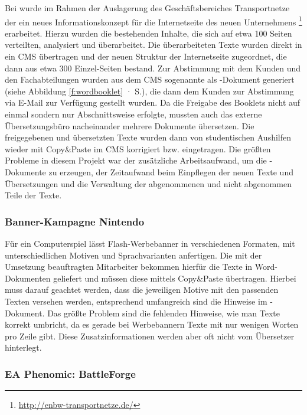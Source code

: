 Bei  wurde im Rahmen der Auslagerung des Geschäftsbereiches Transportnetze der  ein neues Informationskonzept für die Internetseite des neuen Unternehmens \footnote{\url{http://enbw-transportnetze.de/}} erarbeitet. Hierzu wurden die bestehenden Inhalte, die sich auf etwa 100 Seiten verteilten, analysiert und überarbeitet. Die überarbeiteten Texte wurden direkt in ein CMS übertragen und der neuen Struktur der Internetseite zugeordnet, die dann aus etwa 300 Einzel-Seiten bestand. Zur Abstimmung mit dem Kunden und den Fachabteilungen wurden aus dem CMS sogenannte  als -Dokument generiert (siehe Abbildung \ref{f:wordbooklet} · S.\pageref{f:wordbooklet}), die dann dem Kunden zur Abstimmung via E-Mail zur Verfügung gestellt wurden. Da die Freigabe des Booklets nicht auf einmal sondern nur Abschnittsweise erfolgte, mussten auch das externe Übersetzungsbüro nacheinander mehrere Dokumente übersetzen. Die freigegebenen und übersetzten Texte wurden dann von studentischen Aushilfen wieder mit Copy\&Paste im CMS korrigiert bzw. eingetragen. Die größten Probleme in diesem Projekt war der zusätzliche Arbeitsaufwand, um die -Dokumente zu erzeugen, der Zeitaufwand beim Einpflegen der neuen Texte und Übersetzungen und die Verwaltung der abgenommenen und nicht abgenommen Teile der Texte.

\subsubsection{Banner-Kampagne Nintendo}

Für ein Computerspiel lässt  Flash-Werbebanner in verschiedenen Formaten, mit unterschiedlichen Motiven und Sprachvarianten anfertigen. Die mit der Umsetzung beauftragten Mitarbeiter bekommen hierfür die Texte in Word-Dokumenten geliefert und müssen diese mittels Copy\&Paste übertragen. Hierbei muss darauf geachtet werden, dass die jeweiligen Motive mit den passenden Texten versehen werden, entsprechend umfangreich sind die Hinweise im -Dokument. Das größte Problem sind die fehlenden Hinweise, wie man Texte korrekt umbricht, da es gerade bei Werbebannern Texte mit nur wenigen Worten pro Zeile gibt. Diese Zusatzinformationen werden aber oft nicht vom Übersetzer hinterlegt.

\subsubsection{EA Phenomic: BattleForge}

